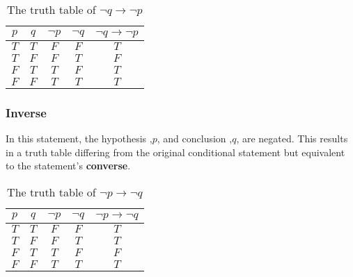 \documentclass[12pt letter]{report}
\begin{document}

\begin{table}[h!]
	\caption{The truth table of $\neg q \to  \neg p$}\label{tab:6}
	\begin{center}
		\begin{tabular}{|c c|c c|c|}
			\hline
			$p$ & $q$ & $ \neg p $ & $\neg q$ & $\neg q \to  \neg p$ \\[0.5ex]
			\hline
			\hline
			$T$ & $T$ & $F$        & $F$      & $T$                  \\
			$T$ & $F$ & $F$        & $T$      & $F$                  \\
			$F$ & $T$ & $T$        & $F$      & $T$                  \\
			$F$ & $F$ & $T$        & $T$      & $T$                  \\
			\hline
		\end{tabular}
	\end{center}
\end{table}


\subsubsection{Inverse}


In this statement, the hypothesis ,$p$, and conclusion ,$q$, are negated. This results in a truth table differing from
the original conditional statement but equivalent to the statement's \textbf{converse}.


\begin{table}[h!]
	\caption{The truth table of $\neg p \to  \neg q$}\label{tab:7}
	\begin{center}
		\begin{tabular}{|c c|c c|c|}
			\hline
			$p$ & $q$ & $ \neg p $ & $\neg q$ & $\neg p \to  \neg q$ \\[0.5ex]
			\hline
			\hline
			$T$ & $T$ & $F$        & $F$      & $T$                  \\
			$T$ & $F$ & $F$        & $T$      & $T$                  \\
			$F$ & $T$ & $T$        & $F$      & $F$                  \\
			$F$ & $F$ & $T$        & $T$      & $T$                  \\
			\hline
		\end{tabular}
	\end{center}
\end{table}
\end{document}
